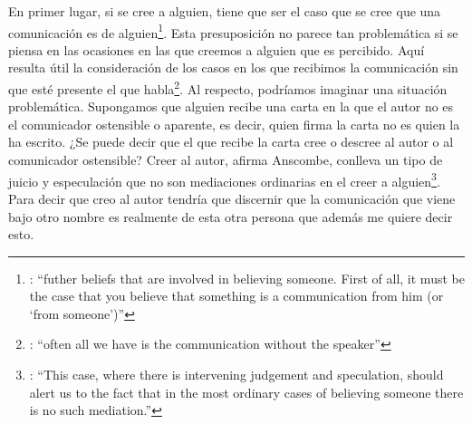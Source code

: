 En primer lugar, si se cree a alguien, tiene que ser el caso que se cree que una comunicación es de alguien\footnote{\cite[Cf.~][6]{anscombe2008faith:tobelieve}: \enquote{futher beliefs that are involved in believing someone. First of all, it must be the case that you believe that something is a communication from him (or `from someone')}}. Esta presuposición no parece tan problemática si se piensa en las ocasiones en las que creemos a alguien que es percibido. Aquí resulta útil la consideración de los casos en los que recibimos la comunicación sin que esté presente el que habla\footnote{\cite[Cf.~][5]{anscombe2008faith:tobelieve}: \enquote{often all we have is the communication without the speaker}}. Al respecto, podríamos imaginar una situación problemática. Supongamos que alguien recibe una carta en la que el autor no es el comunicador ostensible o aparente, es decir, quien firma la carta no es quien la ha escrito. ¿Se puede decir que el que recibe la carta cree o descree al autor o al comunicador ostensible? Creer al autor, afirma Anscombe, conlleva un tipo de juicio y especulación que no son mediaciones ordinarias en el creer a alguien\footnote{\cite[Cf.~][7]{anscombe2008faith:tobelieve}: \enquote{This case, where there is intervening judgement and speculation, should alert us to the fact that in the most ordinary cases of believing someone there is no such mediation.}}. Para decir que creo al autor tendría que discernir que la comunicación que viene bajo otro nombre es realmente de esta otra persona que además me quiere decir esto.

